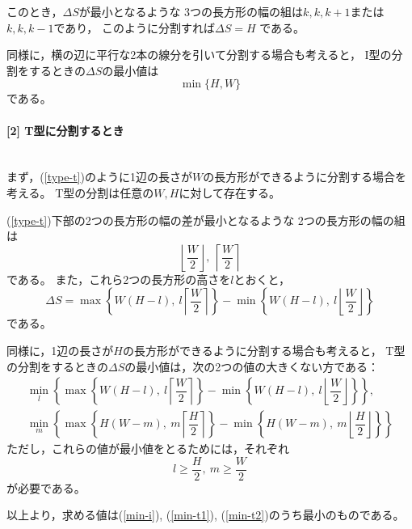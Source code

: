 \documentclass{article}
\newcommand{\myparagraph}[1]{\paragraph{#1}\mbox{}\\}
\begin{document}
このとき，$\Delta S$が最小となるような
3つの長方形の幅の組は$k, k, k + 1$または$k, k, k - 1$であり，
このように分割すれば$\Delta S = H$ である。

同様に，横の辺に平行な2本の線分を引いて分割する場合も考えると，
I型の分割をするときの$\Delta S$の最小値は
\begin{equation}
    \label{min-i}
    \min \{H, W\}
\end{equation}
である。

\myparagraph{[2] T型に分割するとき}

まず，(\cref{type-t})のように1辺の長さが$W$の長方形ができるように分割する場合を考える。
T型の分割は任意の$W, H$に対して存在する。

(\cref{type-t})下部の2つの長方形の幅の差が最小となるような
2つの長方形の幅の組は
\begin{equation*}
    \left\lfloor \dfrac{W}{2} \right\rfloor,\ \left\lceil \dfrac{W}{2} \right\rceil
\end{equation*}
である。
また，これら2つの長方形の高さを$l$とおくと，
\begin{equation*}
    \Delta S
    = \max \left\{ W(H - l),\ l \left\lceil  \dfrac{W}{2} \right\rceil \right\}
    - \min \left\{ W(H - l),\ l \left\lfloor \dfrac{W}{2} \right\rfloor \right\}
\end{equation*}
である。

同様に，1辺の長さが$H$の長方形ができるように分割する場合も考えると，
T型の分割をするときの$\Delta S$の最小値は，次の2つの値の大きくない方である：
\begin{eqnarray}
    \label{min-t1}
    \min_{l} \left\{
      \max \left\{ W(H - l),\ l \left\lceil  \dfrac{W}{2} \right\rceil \right\}
    - \min \left\{ W(H - l),\ l \left\lfloor \dfrac{W}{2} \right\rfloor \right\}
    \right\},
    \\
    \label{min-t2}
    \min_{m} \left\{
      \max \left\{ H(W - m),\ m \left\lceil  \dfrac{H}{2} \right\rceil \right\}
    - \min \left\{ H(W - m),\ m \left\lfloor \dfrac{H}{2} \right\rfloor \right\}
    \right\}
\end{eqnarray}
ただし，これらの値が最小値をとるためには，それぞれ
\begin{equation*}
    l \geq \frac{H}{2},\ 
    m \geq \frac{W}{2}  
\end{equation*}
が必要である。

以上より，求める値は(\ref{min-i}), (\ref{min-t1}), (\ref{min-t2})のうち最小のものである。
\end{document}
